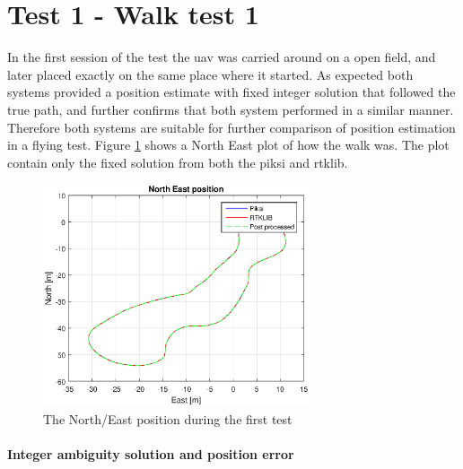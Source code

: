 \section{Test 1 - Walk test 1}

In the first session of the test the \gls{uav} was carried around on a open field, and later placed exactly on the same place where it started. As expected both systems provided a position estimate with fixed integer solution that followed the true path, and further confirms that both system performed in a similar manner. Therefore both systems are suitable for further comparison of position estimation in a flying test.
Figure \ref{figure:xywalk1} shows a North East plot of how the walk was. The plot contain only the fixed solution from both the piksi and rtklib. 
\begin{figure}[H]
	\centering
		\includegraphics[width=0.7\textwidth]{figs/plots/xywalk1.eps}
		\caption{The North/East position during the first test}
		\label{figure:xywalk1}
\end{figure}
\paragraph{Integer ambiguity solution and position error}


